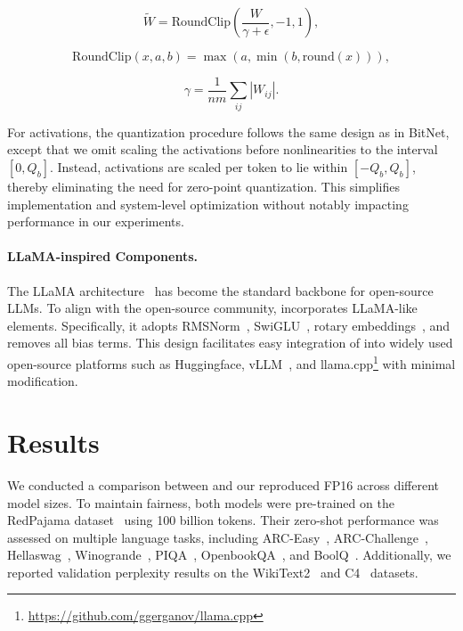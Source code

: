 \begin{equation}
    \widetilde{W} = \mathrm{RoundClip}(\frac{W}{\gamma + \epsilon}, -1, 1),
\end{equation}

\begin{equation}
    \mathrm{RoundClip}(x, a, b) = \max(a, \min(b, \mathrm{round}(x))),
\end{equation}

\begin{equation}
    \gamma = \frac{1}{nm}\sum_{ij} |W_{ij}|.
\end{equation}

For activations, the quantization procedure follows the same design as in BitNet, except that we omit scaling the activations before nonlinearities to the interval $[0, Q_b]$. Instead, activations are scaled per token to lie within $[-Q_b, Q_b]$, thereby eliminating the need for zero-point quantization. This simplifies implementation and system-level optimization without notably impacting performance in our experiments.

\paragraph{LLaMA-inspired Components.}

The LLaMA architecture~\cite{llama, llama2} has become the standard backbone for open-source LLMs. To align with the open-source community,  incorporates LLaMA-like elements. Specifically, it adopts RMSNorm~\cite{rmsnorm}, SwiGLU~\cite{swiglu}, rotary embeddings~\cite{rope}, and removes all bias terms. This design facilitates easy integration of  into widely used open-source platforms such as Huggingface, vLLM~\cite{vllm}, and llama.cpp\footnote{\url{https://github.com/ggerganov/llama.cpp}} with minimal modification.

\section{Results}

We conducted a comparison between  and our reproduced FP16  across different model sizes. To maintain fairness, both models were pre-trained on the RedPajama dataset~\cite{redpajama} using 100 billion tokens. Their zero-shot performance was assessed on multiple language tasks, including ARC-Easy~\cite{arc}, ARC-Challenge~\cite{arc}, Hellaswag~\cite{hellaswag}, Winogrande~\cite{winoGrande}, PIQA~\cite{piqa}, OpenbookQA~\cite{openbookqa}, and BoolQ~\cite{boolq}. Additionally, we reported validation perplexity results on the WikiText2~\cite{wikitext2} and C4~\cite{c4} datasets.

